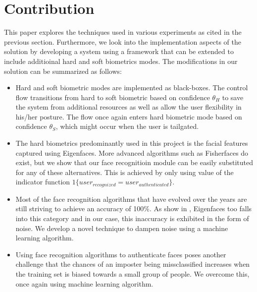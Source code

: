\documentclass[%
        final,
        notitlepage,
        narroweqnarray,
        inline,
        ]{ieee}
\begin{document}
\section{Contribution}
This paper explores the techniques used in various experiments as cited in the previous section.
Furthermore, we look into the implementation aspects of the solution by developing a system using a framework that can be extended to include additioinal hard and soft biometrics modes. 
The modifications in our solution can be summarized as follows:
\begin{itemize}
	\item Hard and soft biometric modes are implemented as black-boxes. The control flow transitions from hard to soft biometric based on confidence $\theta_{H}$ to save the system from additional resources as well as allow the user flexibility in his/her posture. The flow once again enters hard biometric mode based on confidence $\theta_{S}$, which might occur when the user is tailgated.
	\item The hard biometrics predominantly used in this project is the facial features captured using Eigenfaces\cite{Turk91}. More advanced algorithms such as Fisherfaces do exist, but we show that our face recognitioin module can be easily substituted for any of these alternatives. This is achieved by only using value of the indicator function $1\{user_{recognized}=user_{authenticated}\}$.
	\item Most of the face recognition algorithms that have evolved over the years are still striving to achieve an accuracy of 100\%. As show in \cite{fig:no_svm}, Eigenfaces too falls into this category and in our case, this inaccuracy is exhibited in the form of noise. We develop a novel technique to dampen noise using a machine learning algorithm.
	\item Using face recognition algorithms to authenticate faces poses another challenge that the chances of an imposter being missclassified increases when the training set is biased towards a small group of people. We overcome this, once again using machine learning algorithm.
\end{itemize}


\end{document}
